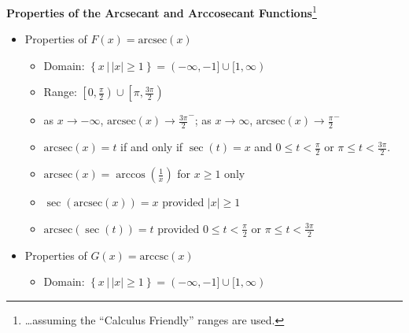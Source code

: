 \colorbox{ResultColor}{\bbm

\begin{thm} \label{arcsecantcosecantfunctionprops2}  \textbf{Properties of the Arcsecant and Arccosecant Functions}\footnote{\ldots assuming the ``Calculus Friendly'' ranges are used.}  

\begin{itemize}

\item Properties of $F(x)= \mbox{arcsec}(x)$  

\begin{itemize}

\item Domain: $\left\{ x \, | \,  |x| \geq 1 \right\} = (-\infty, -1] \cup [1,\infty)$

\item Range: $\left[0, \frac{\pi}{2} \right) \cup \left[\pi, \frac{3\pi}{2} \right)$

\item  as $x \rightarrow -\infty$, $\mbox{arcsec}(x) \rightarrow \frac{3\pi}{2}^{-}$;  as $x \rightarrow \infty$, $\mbox{arcsec}(x) \rightarrow \frac{\pi}{2}^{-}$

\item  $\mbox{arcsec}(x) = t$ if and only if $\sec(t) = x$ and $0 \leq t < \frac{\pi}{2}$ or $ \pi \leq  t < \frac{3\pi}{2}$.

\item  $\mbox{arcsec}(x) = \arccos\left(\frac{1}{x}\right)$ for $x \geq 1$ only %

\item  $\sec\left(\mbox{arcsec}(x)\right) = x$ provided $|x| \geq 1$

\item  $\mbox{arcsec}(\sec(t)) = t$ provided $0 \leq t < \frac{\pi}{2}$ or $ \pi \leq  t < \frac{3\pi}{2}$


\end{itemize}

\item Properties of $G(x) = \mbox{arccsc}(x)$  

\begin{itemize}

\item Domain: $\left\{ x \, | \,  |x| \geq 1 \right\} = (-\infty, -1] \cup [1,\infty)$


\end{itemize}
\end{itemize}
\end{thm}}
